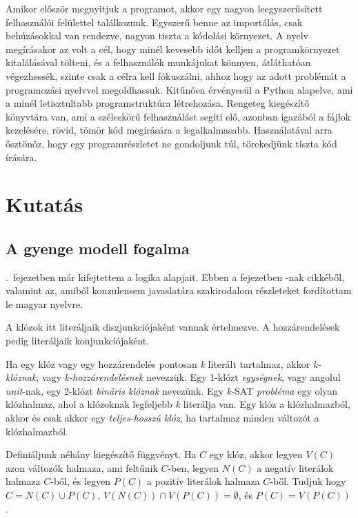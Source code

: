 \documentclass[
]{thesis-ekf}
\theoremstyle{definition}
\theoremstyle{remark}
\begin{document}
	Amikor először megnyitjuk a programot, akkor egy nagyon leegyszerűsített felhasználói felülettel találkozunk. Egyszerű benne az importálás, csak behúzásokkal van rendezve, nagyon tiszta a kódolási környezet. A nyelv megírásakor az volt a cél, hogy minél kevesebb időt kelljen a programkörnyezet kitalálásával tölteni, és a felhasználók munkájukat könnyen, átláthatóan végezhessék, szinte csak a célra kell fókuszálni, ahhoz hogy az adott problémát a programozási nyelvvel megoldhassuk. Kitűnően érvényesül a Python alapelve, ami a minél letisztultabb programstruktúra létrehozása. Rengeteg kiegészítő könyvtára van, ami a széleskörű felhasználást segíti elő, azonban igazából a fájlok kezelésére, rövid, tömör kód megírására a legalkalmasabb. Használatával arra ösztönöz, hogy egy programrészletet ne gondoljunk túl, törekedjünk tiszta kód írására.
	
\chapter{Kutatás}
	\section{A gyenge modell fogalma}\label{sec-szakirodalom-forditas}
	
	\Az{\ref{sec-alap-fogalmak-logika}}.~fejezetben már kifejtettem a logika alapjait. Ebben a fejezetben -nak cikkéből, valamint  az, amiből konzulensem javaslatára szakirodalom részleteket fordítottam le magyar nyelvre.
	
	A klózok itt literáljaik diszjunkciójaként vannak értelmezve. A hozzárendelések pedig literáljaik konjunkciójaként.
	
	Ha egy klóz vagy egy hozzárendelés pontosan \emph{k} literált tartalmaz, akkor \emph{k-klóznak}, vagy \emph{k-hozzárendelésnek} nevezzük. Egy 1-klózt \emph{egységnek}, vagy angolul \emph{unit}-nak, egy 2-klózt \emph{bináris klóznak} nevezünk. Egy \emph{k-}\textsc{SAT} \emph{probléma} egy olyan klózhalmaz, ahol a klózoknak legfeljebb \emph{k} literálja van. Egy klóz a klózhalmazból, akkor és csak akkor egy \emph{teljes-hosszú klóz}, ha tartalmaz minden változót a klózhalmazból.
	
	Definiáljunk néhány kiegészítő függvényt. Ha $ C $ egy klóz, akkor legyen $ V(C) $ azon változók halmaza, ami feltűnik $ C $-ben, legyen $ N(C) $ a negatív literálok halmaza $ C $-ből, és legyen $ P(C) $ a pozitív literálok halmaza $ C $-ből. Tudjuk hogy $ C=N(C)\cup P(C)$, $V(N(C))\cap V(P(C))=\emptyset $, és $ P(C)=V(P(C)) $.
	
\end{document}
